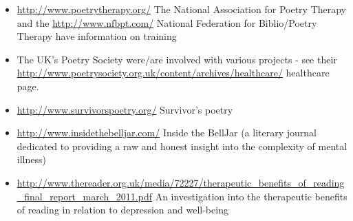 \documentclass[11pt]{article}
\begin{document}
\begin{itemize}
         \item  \url{http://www.poetrytherapy.org/} The National Association for Poetry Therapy and the \url{http://www.nfbpt.com/} National Federation for
Biblio/Poetry Therapy have information on training
         \item  The UK's Poetry Society were/are involved with various projects - see their
    \url{http://www.poetrysociety.org.uk/content/archives/healthcare/} healthcare page.
         \item  \url{http://www.survivorspoetry.org/} Survivor's poetry
\item \url{http://www.insidethebelljar.com/} Inside the BellJar (a literary journal dedicated to providing a raw and honest insight into the complexity of mental illness)
\item \url{http://www.thereader.org.uk/media/72227/therapeutic_benefits_of_reading_final_report_march_2011.pdf} An investigation into the therapeutic benefits of reading in relation to depression and well-being
\end{itemize}
\end{document}
